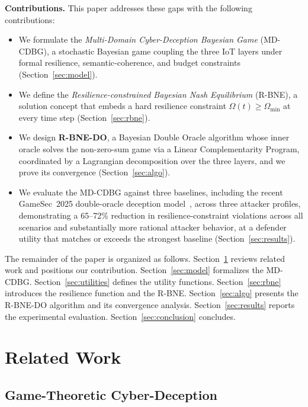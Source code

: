 \documentclass[conference]{IEEEtran}
\begin{document}
\textbf{Contributions.} This paper addresses these gaps with the following
contributions:
\begin{itemize}
\item We formulate the \emph{Multi-Domain Cyber-Deception Bayesian Game}
(MD-CDBG), a stochastic Bayesian game coupling the three IoT layers under
formal resilience, semantic-coherence, and budget constraints
(Section~\ref{sec:model}).
\item We define the \emph{Resilience-constrained Bayesian Nash Equilibrium}
(R-BNE), a solution concept that embeds a hard resilience constraint
$\Omega(t)\geq\Omega_{\min}$ at every time step (Section~\ref{sec:rbne}).
\item We design \textbf{R-BNE-DO}, a Bayesian Double Oracle algorithm whose
inner oracle solves the non-zero-sum game via a Linear Complementarity Program,
coordinated by a Lagrangian decomposition over the three layers, and we prove
its convergence (Section~\ref{sec:algo}).
\item We evaluate the MD-CDBG against three baselines, including the recent
GameSec~2025 double-oracle deception model~\cite{asghar2025}, across three
attacker profiles, demonstrating a 65--72\% reduction in resilience-constraint
violations across all scenarios and substantially more rational attacker
behavior, at a defender utility that matches or exceeds the strongest baseline
(Section~\ref{sec:results}).
\end{itemize}

The remainder of the paper is organized as follows.
Section~\ref{sec:related} reviews related work and positions our contribution.
Section~\ref{sec:model} formalizes the MD-CDBG. Section~\ref{sec:utilities}
defines the utility functions. Section~\ref{sec:rbne} introduces the resilience
function and the R-BNE. Section~\ref{sec:algo} presents the R-BNE-DO algorithm
and its convergence analysis. Section~\ref{sec:results} reports the
experimental evaluation. Section~\ref{sec:conclusion} concludes.

\section{Related Work}
\label{sec:related}

\subsection{Game-Theoretic Cyber-Deception}
\end{document}

